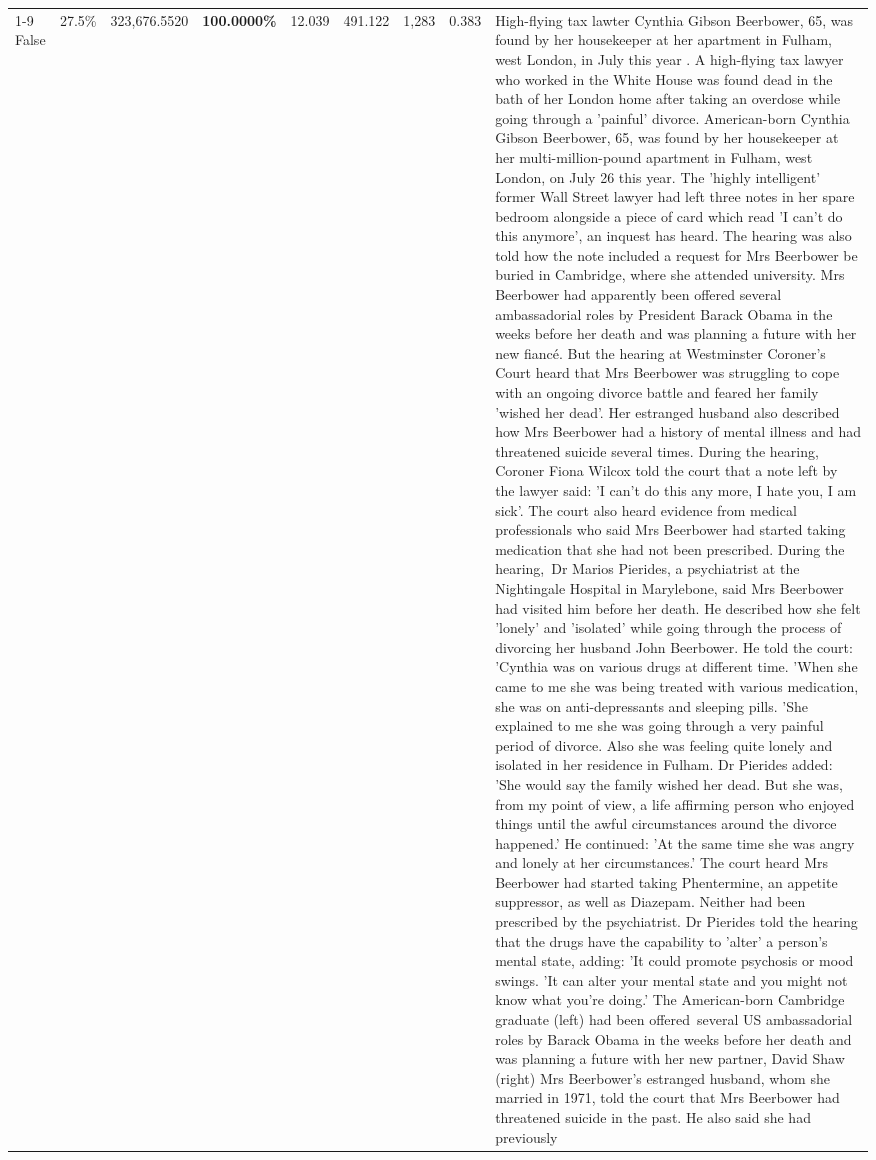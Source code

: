 \begin{table}[H]
\begin{tabular}{lllrlllll}
\cline{1-9}
False & 27.5\% & 323,676.5520 & \bfseries \color{red} 100.0000\% & 12.039 & 491.122 & 1,283 & 0.383 & High-flying tax lawter Cynthia Gibson Beerbower, 65, was found by her housekeeper at her apartment in Fulham, west London, in July this year . A high-flying tax lawyer who worked in the White House was found dead in the bath of her London home after taking an overdose while going through a 'painful' divorce. American-born Cynthia Gibson Beerbower, 65, was found by her housekeeper at her multi-million-pound apartment in Fulham, west London, on July 26 this year. The 'highly intelligent' former Wall Street lawyer had left three notes in her spare bedroom alongside a piece of card which read 'I can't do this anymore', an inquest has heard. The hearing was also told how the note included a request for Mrs Beerbower be buried in Cambridge, where she attended university. Mrs Beerbower had apparently been offered several ambassadorial roles by President Barack Obama in the weeks before her death and was planning a future with her new fiancé. But the hearing at Westminster Coroner's Court heard that Mrs Beerbower was struggling to cope with an ongoing divorce battle and feared her family 'wished her dead'. Her estranged husband also described how Mrs Beerbower had a history of mental illness and had threatened suicide several times. During the hearing, Coroner Fiona Wilcox told the court that a note left by the lawyer said: 'I can't do this any more, I hate you, I am sick'. The court also heard evidence from medical professionals who said Mrs Beerbower had started taking medication that she had not been prescribed. During the hearing, Dr Marios Pierides, a psychiatrist at the Nightingale Hospital in Marylebone, said Mrs Beerbower had visited him before her death. He described how she felt 'lonely' and 'isolated' while going through the process of divorcing her husband John Beerbower. He told the court: 'Cynthia was on various drugs at different time. 'When she came to me she was being treated with various medication, she was on anti-depressants and sleeping pills. 'She explained to me she was going through a very painful period of divorce. Also she was feeling quite lonely and isolated in her residence in Fulham. Dr Pierides added: 'She would say the family wished her dead. But she was, from my point of view, a life affirming person who enjoyed things until the awful circumstances around the divorce happened.' He continued: 'At the same time she was angry and lonely at her circumstances.' The court heard Mrs Beerbower had started taking Phentermine, an appetite suppressor, as well as Diazepam. Neither had been prescribed by the psychiatrist. Dr Pierides told the hearing that the drugs have the capability to 'alter' a person's mental state, adding: 'It could promote psychosis or mood swings. 'It can alter your mental state and you might not know what you're doing.' The American-born Cambridge graduate (left) had been offered several US ambassadorial roles by Barack Obama in the weeks before her death and was planning a future with her new partner, David Shaw (right) Mrs Beerbower's estranged husband, whom she married in 1971, told the court that Mrs Beerbower had threatened suicide in the past. He also said she had previously 
\end{tabular}
\end{table}

